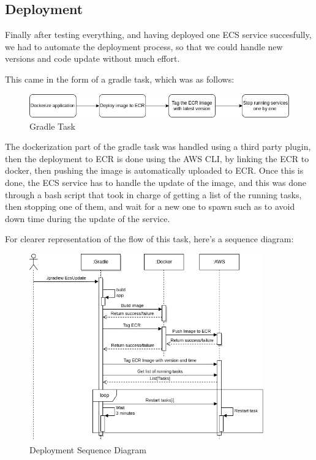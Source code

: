 \subsection{Deployment}

Finally after testing everything, and having deployed one ECS service succesfully, we had
to automate the deployment process, so that we could handle new versions and code update
without much effort.

This came in the form of a gradle task, which was as follows:

    \begin{figure}[!htbp]
        \centering
        \includegraphics[width=\textwidth]{images/gradle.png}
        \caption{\footnotesize{Gradle Task}}
        \label{fig:gradle}
    \end{figure}

The dockerization part of the gradle task was handled using a third party plugin,
then the deployment to ECR is done using the AWS CLI, by linking the ECR to docker,
then pushing the image is automatically uploaded to ECR.
Once this is done, the ECS service has to handle the update of the image, 
and this was done through a bash script that took in charge of getting a list 
of the running tasks, then stopping one of them, and wait for a new one to spawn 
such as to avoid down time during the update of the service.

For clearer representation of the flow of this task, here's a sequence diagram:

    \begin{figure}[!htbp]
        \centering
        \includegraphics[width=0.9\textwidth]{images/gradleTask.png}
        \caption{\footnotesize{Deployment Sequence Diagram}}
        \label{fig:deployment}
    \end{figure}


